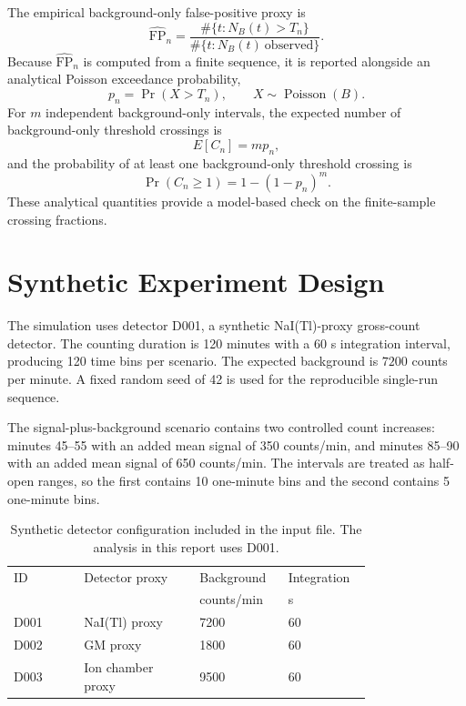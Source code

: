 \documentclass[11pt,twocolumn]{article}
\newcommand{\Pois}{\operatorname{Poisson}}
\begin{document}
The empirical background-only false-positive proxy is
\begin{equation}
\widehat{\mathrm{FP}}_n=
\frac{\#\{t:N_B(t)>T_n\}}{\#\{t:N_B(t)\ \mathrm{observed}\}}.
\label{eq:false-positive-proxy}
\end{equation}
Because \(\widehat{\mathrm{FP}}_n\) is computed from a finite sequence, it is reported alongside an analytical Poisson exceedance probability,
\begin{equation}
p_n = \Pr(X>T_n),\qquad X\sim\Pois(B).
\label{eq:poisson-tail}
\end{equation}
For \(m\) independent background-only intervals, the expected number of background-only threshold crossings is
\begin{equation}
E[C_n]=mp_n,
\label{eq:expected-crossings}
\end{equation}
and the probability of at least one background-only threshold crossing is
\begin{equation}
\Pr(C_n\ge 1)=1-(1-p_n)^m.
\label{eq:at-least-one}
\end{equation}
These analytical quantities provide a model-based check on the finite-sample crossing fractions.

\section{Synthetic Experiment Design}

The simulation uses detector D001, a synthetic NaI(Tl)-proxy gross-count detector. The counting duration is 120 minutes with a 60 s integration interval, producing 120 time bins per scenario. The expected background is \(7200\) counts per minute. A fixed random seed of 42 is used for the reproducible single-run sequence.

The signal-plus-background scenario contains two controlled count increases: minutes 45--55 with an added mean signal of 350 counts/min, and minutes 85--90 with an added mean signal of 650 counts/min. The intervals are treated as half-open ranges, so the first contains 10 one-minute bins and the second contains 5 one-minute bins.

\begin{table}[!htbp]
\centering
\scriptsize
\caption{Synthetic detector configuration included in the input file. The analysis in this report uses D001.}
\label{tab:config}
\begin{tabular}{L{0.17\linewidth} L{0.28\linewidth} C{0.17\linewidth} C{0.16\linewidth}}
\toprule
ID & Detector proxy & Background & Integration \\
 & & counts/min & s \\
\midrule
D001 & NaI(Tl) proxy & 7200 & 60 \\
D002 & GM proxy & 1800 & 60 \\
D003 & Ion chamber proxy & 9500 & 60 \\
\bottomrule
\end{tabular}
\end{table}
\end{document}

